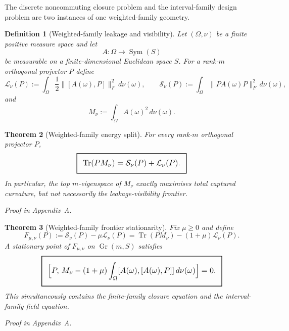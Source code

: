 \documentclass[11pt,a4paper]{article}
\numberwithin{equation}{section}
\DeclareMathOperator{\Tr}{Tr}
\DeclareMathOperator{\Gr}{Gr}
\DeclareMathOperator{\Sym}{Sym}
\newcommand{\geomboxed}[1]{%
  \setlength{\fboxsep}{8pt}%
  \setlength{\fboxrule}{0.9pt}%
  \fbox{\scalebox{1.12}{$\displaystyle #1$}}%
}
\theoremstyle{thmcompact}
\newtheorem{theorem}{Theorem}[section]
\newtheorem{definition}[theorem]{Definition}
\theoremstyle{remark}
\newcommand{\proofappendix}{\par{\hfill\scriptsize\emph{Proof in Appendix~A.}}\par}
\begin{document}
The discrete noncommuting closure problem and the interval-family design problem are two instances of one weighted-family geometry.

\begin{definition}[Weighted-family leakage and visibility]
Let $(\Omega,\nu)$ be a finite positive measure space and let
\begin{equation}
A:\Omega\to\Sym(S)
\end{equation}
be measurable on a finite-dimensional Euclidean space $S$. For a rank-$m$ orthogonal projector $P$ define
\begin{equation}
\mathcal L_\nu(P):=\int_\Omega \frac12\|[A(\omega),P]\|_F^2\,d\nu(\omega),
\qquad
\mathcal S_\nu(P):=\int_\Omega \|PA(\omega)P\|_F^2\,d\nu(\omega),
\end{equation}
and
\begin{equation}
M_\nu:=\int_\Omega A(\omega)^2\,d\nu(\omega).
\end{equation}
\end{definition}

\begin{theorem}[Weighted-family energy split]
\label{thm:weighted-energy-split}
For every rank-$m$ orthogonal projector $P$,
\begin{equation}
\geomboxed{\Tr(PM_\nu)=\mathcal S_\nu(P)+\mathcal L_\nu(P).}
\end{equation}
In particular, the top $m$-eigenspace of $M_\nu$ exactly maximises total captured curvature, but not necessarily the leakage-visibility frontier.
\end{theorem}

\proofappendix

\begin{theorem}[Weighted-family frontier stationarity]
\label{thm:weighted-stationarity}
Fix $\mu\ge 0$ and define
\begin{equation}
F_{\mu,\nu}(P):=\mathcal S_\nu(P)-\mu\mathcal L_\nu(P)
=\Tr(PM_\nu)-(1+\mu)\mathcal L_\nu(P).
\end{equation}
A stationary point of $F_{\mu,\nu}$ on $\Gr(m,S)$ satisfies
\begin{equation}
\geomboxed{\Bigl[P,\,M_\nu-(1+\mu)\int_\Omega [A(\omega),[A(\omega),P]]\,d\nu(\omega)\Bigr]=0.}
\label{eq:weighted-stationarity}
\end{equation}
This simultaneously contains the finite-family closure equation and the interval-family field equation.
\end{theorem}

\proofappendix
\end{document}
